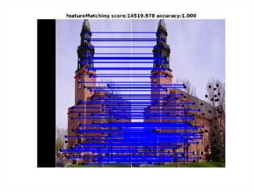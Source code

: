 \documentclass[
	fontsize=12pt,
	paper=a4,
	twoside=false,
	numbers=noenddot,
	plainheadsepline,
	toc=listof,
	toc=bibliography
]{scrartcl}
\begin{document}
\begin{figure}[h]
\begin{subfigure}[b]{0.33\textwidth}
		\includegraphics[scale=0.25]{"fig_ver2608/RealImages/ImgTrafo/no_descr/using_cpd_afftrafo/fi_3_featureMatching"} 
	\end{subfigure} 	


\end{figure}
\end{document}
